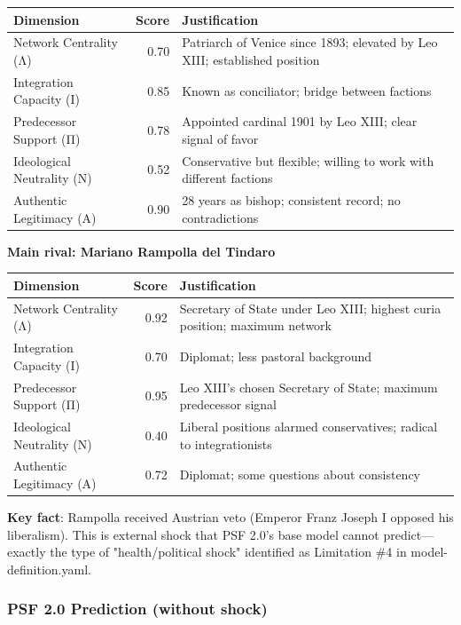 \begin{center}
\begin{tabular}{lrp{4cm}}
\toprule
\textbf{Dimension} & \textbf{Score} & \textbf{Justification} \\
\midrule
Network Centrality (Λ) & 0.70 & Patriarch of Venice since 1893; elevated by Leo XIII; established position \\
Integration Capacity (Ι) & 0.85 & Known as conciliator; bridge between factions \\
Predecessor Support (Π) & 0.78 & Appointed cardinal 1901 by Leo XIII; clear signal of favor \\
Ideological Neutrality (Ν) & 0.52 & Conservative but flexible; willing to work with different factions \\
Authentic Legitimacy (Α) & 0.90 & 28 years as bishop; consistent record; no contradictions \\
\bottomrule
\end{tabular}
\end{center}

\textbf{Main rival: Mariano Rampolla del Tindaro}

\begin{center}
\begin{tabular}{lrp{4cm}}
\toprule
\textbf{Dimension} & \textbf{Score} & \textbf{Justification} \\
\midrule
Network Centrality (Λ) & 0.92 & Secretary of State under Leo XIII; highest curia position; maximum network \\
Integration Capacity (Ι) & 0.70 & Diplomat; less pastoral background \\
Predecessor Support (Π) & 0.95 & Leo XIII's chosen Secretary of State; maximum predecessor signal \\
Ideological Neutrality (Ν) & 0.40 & Liberal positions alarmed conservatives; radical to integrationists \\
Authentic Legitimacy (Α) & 0.72 & Diplomat; some questions about consistency \\
\bottomrule
\end{tabular}
\end{center}

\textbf{Key fact}: Rampolla received Austrian veto (Emperor Franz Joseph I opposed his liberalism). This is external shock that PSF 2.0's base model cannot predict---exactly the type of "health/political shock" identified as Limitation \#4 in model-definition.yaml.

\subsubsection{PSF 2.0 Prediction (without shock)}

